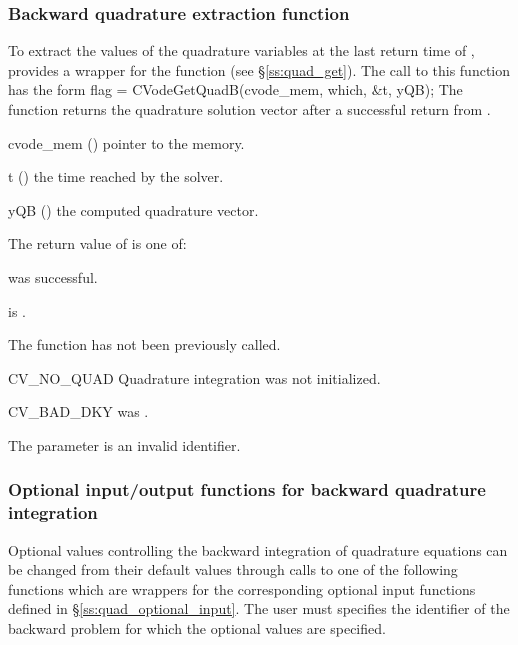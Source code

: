 \subsubsection{Backward quadrature extraction function}
\label{sss:quad_get_b}
To extract the values of the quadrature variables at the last return time
of , {\cvodes} provides a wrapper for the function 
(see \S\ref{ss:quad_get}). The call to this function has the form
{
  flag = CVodeGetQuadB(cvode\_mem, which, \&t, yQB);
}
{
  The function  returns the quadrature solution vector after
  a successful return from .
}
{
  \begin{args}
  \item[cvode\_mem] ()
    pointer to the {\cvodes} memory.
  \item[t] ()
    the time reached by the solver.
  \item[yQB] ()
    the computed quadrature vector.
  \end{args}
}
{
  The return value  of  is one of:
  \begin{args}
  \item[\Id{CV\_SUCCESS}] 
     was successful.
  \item[\Id{CV\_MEM\_NULL}] 
     is .
  \item[\Id{CV\_NO\_ADJ}]
    The function  has not been previously called.
  \item[CV\_NO\_QUAD] 
    Quadrature integration was not initialized.
  \item[CV\_BAD\_DKY] 
     was .
  \item[\Id{CV\_ILL\_INPUT}]
    The parameter  is an invalid identifier.
  \end{args}
}
{}

\subsubsection{Optional input/output functions for backward quadrature integration}
\label{sss:quad_optional_input_B}
Optional values controlling the backward integration of quadrature equations can be 
changed from their default values through calls to one of the following functions 
which are wrappers for the corresponding optional input functions defined in 
\S\ref{ss:quad_optional_input}. The user must specifies  the identifier  
of the backward problem for which the optional values are specified.

